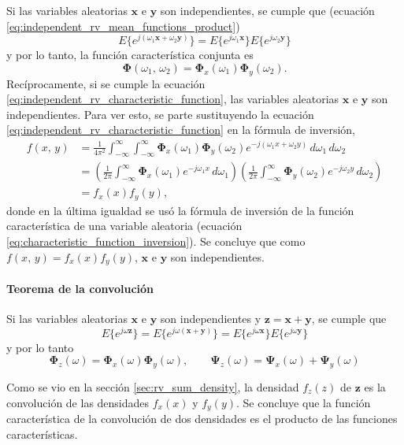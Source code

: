 \documentclass[a4paper]{report}
\newcommand{\x}{\mathbf{x}}
\newcommand{\y}{\mathbf{y}}
\newcommand{\z}{\mathbf{z}}
\newcommand{\Phibf}{\mathbf{\Phi}}
\newcommand{\Psibf}{\mathbf{\Psi}}
\begin{document}
Si las variables aleatorias \(\x\) e \(\y\) son independientes, se cumple que (ecuación \ref{eq:independent_rv_mean_functions_product})
\[
 E\{e^{j(\omega_1\x+\omega_2\y)}\}=E\{e^{j\omega_1\x}\}E\{e^{j\omega_2\y}\}
\]
y por lo tanto, la función característica conjunta es
\begin{equation}\label{eq:independent_rv_characteristic_function}
 \Phibf(\omega_1,\,\omega_2)=\Phibf_x(\omega_1)\Phibf_y(\omega_2).
\end{equation}
Recíprocamente, si se cumple la ecuación \ref{eq:independent_rv_characteristic_function}, las variables aleatorias \(\x\) e \(\y\) son independientes. Para ver esto, se parte sustituyendo la ecuación \ref{eq:independent_rv_characteristic_function} en la fórmula de inversión,
\begin{align*}
 f(x,\,y)&=\frac{1}{4\pi^2}\int_{-\infty}^{\infty}\int_{-\infty}^{\infty}\Phibf_x(\omega_1)\Phibf_y(\omega_2)e^{-j(\omega_1x+\omega_2y)}\,d\omega_1\,d\omega_2\\
 &=\left(\frac{1}{2\pi}\int_{-\infty}^{\infty}\Phibf_x(\omega_1)e^{-j\omega_1x}\,d\omega_1\right)  \left(\frac{1}{2\pi}\int_{-\infty}^{\infty}\Phibf_y(\omega_2)e^{-j\omega_2y}\,d\omega_2\right)\\
 &=f_x(x)f_y(y),
\end{align*}
donde en la última igualdad se usó la fórmula de inversión de la función característica de una variable aleatoria (ecuación \ref{eq:characteristic_function_inversion}). Se concluye que como \(f(x,\,y)=f_x(x)f_y(y)\), \(\x\) e \(\y\) son independientes.

\paragraph{Teorema de la convolución}

Si las variables aleatorias \(\x\) e \(\y\) son independientes y \(\z=\x+\y\), se cumple que
\[
 E\{e^{j\omega\z}\}=E\{e^{j\omega(\x+\y)}\}=E\{e^{j\omega\x}\}E\{e^{j\omega\y}\}
\]
y por lo tanto
\begin{equation}\label{eq:characteristic_function_convolution_theorem}
 \Phibf_z(\omega)=\Phibf_x(\omega)\Phibf_y(\omega),\qquad \Psibf_z(\omega)=\Psibf_x(\omega)+\Psibf_y(\omega)
\end{equation}

Como se vio en la sección \ref{sec:rv_sum_density}, la densidad \(f_z(z)\) de \(\z\) es la convolución de las densidades \(f_x(x)\) y \(f_y(y)\). Se concluye que la función característica de la convolución de dos densidades es el producto de las funciones características. 
\end{document}

